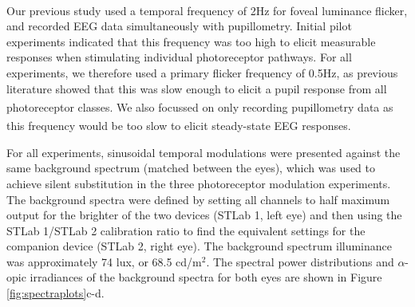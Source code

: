 \documentclass[
]{article}
\begin{document}
Our previous study\textsuperscript{} used a temporal frequency of 2Hz for foveal luminance flicker, and recorded EEG data simultaneously with pupillometry. Initial pilot experiments indicated that this frequency was too high to elicit measurable responses when stimulating individual photoreceptor pathways. For all experiments, we therefore used a primary flicker frequency of 0.5Hz, as previous literature showed that this was slow enough to elicit a pupil response from all photoreceptor classes\textsuperscript{}. We also focussed on only recording pupillometry data as this frequency would be too slow to elicit steady-state EEG responses\textsuperscript{}.

For all experiments, sinusoidal temporal modulations were presented against the same background spectrum (matched between the eyes), which was used to achieve silent substitution in the three photoreceptor modulation experiments. The background spectra were defined by setting all channels to half maximum output for the brighter of the two devices (STLab 1, left eye) and then using the STLab 1/STLab 2 calibration ratio to find the equivalent settings for the companion device (STLab 2, right eye). The background spectrum illuminance was approximately 74 lux, or 68.5 cd/m\(^2\). The spectral power distributions and \(\alpha\)-opic irradiances of the background spectra for both eyes are shown in Figure \ref{fig:spectraplots}c-d.
\end{document}
